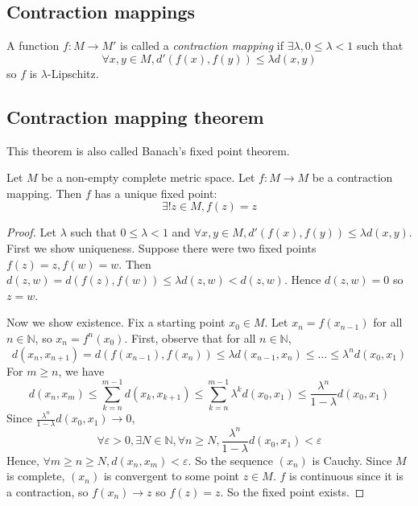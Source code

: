 \subsection{Contraction mappings}
\begin{definition}
	A function \( f \colon M \to M' \) is called a \textit{contraction mapping} if \( \exists \lambda, 0 \leq \lambda < 1 \) such that
	\[
		\forall x,y \in M, d'(f(x),f(y)) \leq \lambda d(x,y)
	\]
	so \( f \) is \( \lambda \)-Lipschitz.
\end{definition}

\subsection{Contraction mapping theorem}
This theorem is also called Banach's fixed point theorem.
\begin{theorem}
	Let \( M \) be a non-empty complete metric space.
	Let \( f \colon M \to M \) be a contraction mapping.
	Then \( f \) has a unique fixed point:
	\[
		\exists!
		z \in M, f(z) = z
	\]
\end{theorem}
\begin{proof}
	Let \( \lambda \) such that \( 0 \leq \lambda < 1 \) and \( \forall x,y \in M, d'(f(x),f(y)) \leq \lambda d(x,y) \).
	First we show uniqueness.
	Suppose there were two fixed points \( f(z) = z, f(w) = w \).
	Then \( d(z,w) = d(f(z), f(w)) \leq \lambda d(z,w) < d(z,w) \).
	Hence \( d(z,w) = 0 \) so \( z = w \).

	Now we show existence.
	Fix a starting point \( x_0 \in M \).
	Let \( x_n = f(x_{n-1}) \) for all \( n \in \mathbb N \), so \( x_n = f^n(x_0) \).
	First, observe that for all \( n \in \mathbb N \),
	\[
		d(x_n, x_{n+1}) = d(f(x_{n-1}), f(x_n)) \leq \lambda d(x_{n-1}, x_n) \leq \dots \leq \lambda^n d(x_0, x_1)
	\]
	For \( m \geq n \), we have
	\[
		d(x_n, x_m) \leq \sum_{k=n}^{m-1} d(x_k, x_{k+1}) \leq \sum_{k=n}^{m-1} \lambda^k d(x_0, x_1) \leq \frac{\lambda^n}{1-\lambda} d(x_0, x_1)
	\]
	Since \( \frac{\lambda^n}{1 - \lambda} d(x_0, x_1) \to 0 \),
	\[
		\forall \varepsilon > 0, \exists N \in \mathbb N, \forall n \geq N, \frac{\lambda^n}{1-\lambda} d(x_0, x_1) < \varepsilon
	\]
	Hence, \( \forall m \geq n \geq N, d(x_n, x_m) < \varepsilon \).
	So the sequence \( (x_n) \) is Cauchy.
	Since \( M \) is complete, \( (x_n) \) is convergent to some point \( z \in M \).
	\( f \) is continuous since it is a contraction, so \( f(x_n) \to z \) so \( f(z) = z \).
	So the fixed point exists.
\end{proof}
